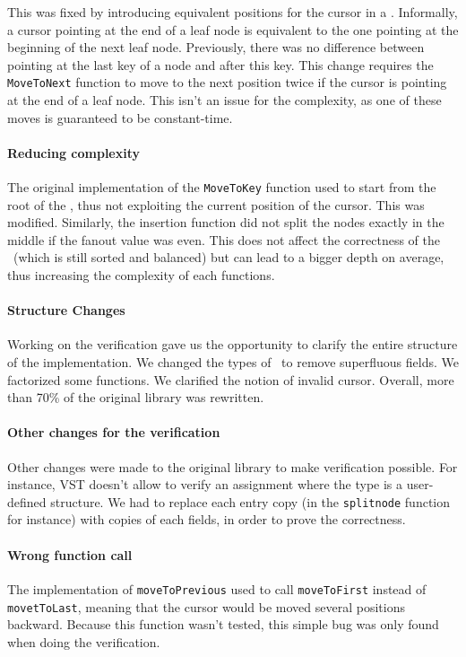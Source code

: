 This was fixed by introducing equivalent positions for the cursor in a \btree.
Informally, a cursor pointing at the end of a leaf node is equivalent to the one pointing at the beginning of the next leaf node.
Previously, there was no difference between pointing at the last key of a node and after this key.
This change requires the \lstinline{MoveToNext} function to move to the next position twice if the cursor is pointing at the end of a leaf node.
This isn't an issue for the complexity, as one of these moves is guaranteed to be constant-time.

\paragraph{Reducing complexity}
The original implementation of the \lstinline{MoveToKey} function used to start from the root of the \btree, thus not exploiting the current position of the cursor. This was modified.
Similarly, the insertion function did not split the nodes exactly in the middle if the fanout value was even.
This does not affect the correctness of the \btree\ (which is still sorted and balanced) but can lead to a bigger depth on average, thus increasing the complexity of each functions.

\paragraph{Structure Changes}
Working on the verification gave us the opportunity to clarify the entire structure of the implementation.
We changed the types of \btrees\ to remove superfluous fields. We factorized some functions. We clarified the notion of invalid cursor.
Overall, more than 70\% of the original library was rewritten.

\paragraph{Other changes for the verification}
Other changes were made to the original library to make verification possible.
For instance, VST doesn't allow to verify an assignment where the type is a user-defined structure.
We had to replace each entry copy (in the \lstinline{splitnode} function for instance) with copies of each fields, in order to prove the correctness.

\paragraph{Wrong function call} The implementation of \lstinline{moveToPrevious} used to call \lstinline{moveToFirst} instead of \lstinline{movetToLast}, meaning that the cursor would be moved several positions backward.
Because this function wasn't tested, this simple bug was only found when doing the verification.

